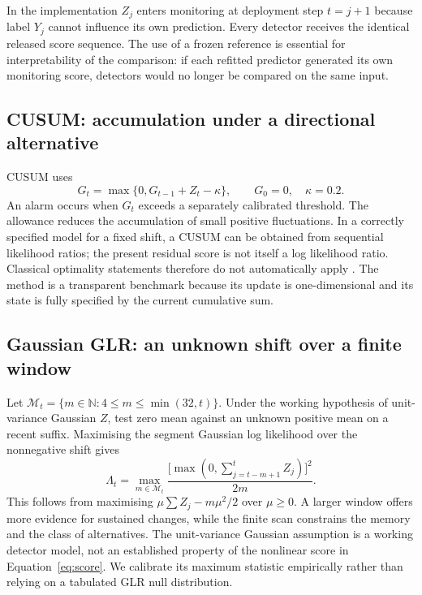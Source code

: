 \documentclass[11pt,a4paper]{article}
\begin{document}
In the implementation $Z_j$ enters monitoring at deployment step $t=j+1$ because label $Y_j$ cannot influence its own prediction. Every detector receives the identical released score sequence. The use of a frozen reference is essential for interpretability of the comparison: if each refitted predictor generated its own monitoring score, detectors would no longer be compared on the same input.

\subsection{CUSUM: accumulation under a directional alternative}
CUSUM uses
\begin{equation}\label{eq:cusum}
 G_t=\max\{0,G_{t-1}+Z_t-\kappa\},\qquad G_0=0,\quad\kappa=0.2.
\end{equation}
An alarm occurs when $G_t$ exceeds a separately calibrated threshold. The allowance reduces the accumulation of small positive fluctuations. In a correctly specified model for a fixed shift, a CUSUM can be obtained from sequential likelihood ratios; the present residual score is not itself a log likelihood ratio. Classical optimality statements therefore do not automatically apply \cite{page1954,lorden1971,basseville1993}. The method is a transparent benchmark because its update is one-dimensional and its state is fully specified by the current cumulative sum.

\subsection{Gaussian GLR: an unknown shift over a finite window}
Let $\mathcal M_t=\{m\in\mathbb N:4\leq m\leq\min(32,t)\}$. Under the working hypothesis of unit-variance Gaussian $Z$, test zero mean against an unknown positive mean on a recent suffix. Maximising the segment Gaussian log likelihood over the nonnegative shift gives
\begin{equation}\label{eq:glr}
 \Lambda_t=\max_{m\in\mathcal M_t}\frac{\bigl[\max(0,\sum_{j=t-m+1}^{t}Z_j)\bigr]^2}{2m}.
\end{equation}
This follows from maximising $\mu\sum Z_j-m\mu^2/2$ over $\mu\geq0$. A larger window offers more evidence for sustained changes, while the finite scan constrains the memory and the class of alternatives. The unit-variance Gaussian assumption is a working detector model, not an established property of the nonlinear score in Equation~\eqref{eq:score}. We calibrate its maximum statistic empirically rather than relying on a tabulated GLR null distribution.
\end{document}
